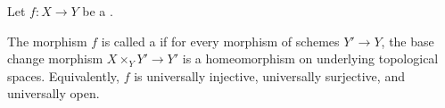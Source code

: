 \begin{definition} \label{definition:universal_homeomorphism_of_schemes}
    Let $f: X \to Y$ be a .

    The morphism $f$ is called a  if for every morphism of schemes $Y' \to Y$, the base change morphism $X \times_Y Y' \to Y'$ is a homeomorphism on underlying topological spaces. Equivalently, $f$ is universally injective, universally surjective, and universally open.
\end{definition}
